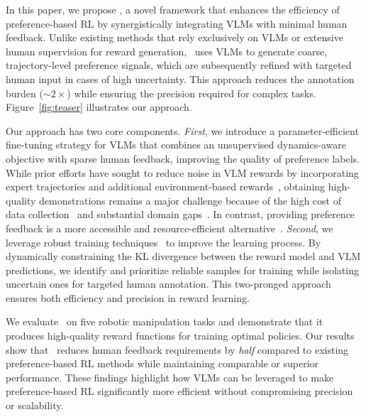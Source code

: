 In this paper, we propose \algo, a novel framework that enhances the efficiency of preference-based RL by synergistically integrating VLMs with minimal human feedback. Unlike existing methods that rely exclusively on VLMs or extensive human supervision for reward generation, \algo~uses VLMs to generate coarse, trajectory-level preference signals, which are subsequently refined with targeted human input in cases of high uncertainty. This approach reduces the annotation burden ($\sim 2\times$) while ensuring the precision required for complex tasks. 
Figure~\ref{fig:teaser} illustrates our approach.

Our approach has two core components. 
\textit{First}, we introduce a parameter-efficient fine-tuning strategy for VLMs that combines an unsupervised dynamics-aware objective with sparse human feedback, improving the quality of preference labels. 
While prior efforts have sought to reduce noise in VLM rewards by incorporating expert trajectories and additional environment-based rewards~\cite{fu2024furl}, obtaining high-quality demonstrations remains a major challenge because of the high cost of data collection~\cite{akgun2012keyframe} and substantial domain gaps~\cite{smith2019avid}. 
In contrast, providing preference feedback is a more accessible and resource-efficient alternative~\cite{hejna2023few}. 
\textit{Second}, we leverage robust training techniques~\cite{song2022learning,cheng2024rime} to improve the learning process. 
By dynamically constraining the KL divergence between the reward model and VLM predictions, we identify and prioritize reliable samples for training while isolating uncertain ones for targeted human annotation. 
This two-pronged approach ensures both efficiency and precision in reward learning.

We evaluate \algo~on five robotic manipulation tasks and demonstrate that it produces high-quality reward functions for training optimal policies. 
Our results show that \algo~reduces human feedback requirements by \emph{half} compared to existing preference-based RL methods while maintaining comparable or superior performance. 
These findings highlight how VLMs can be leveraged to make preference-based RL significantly more efficient without compromising precision or scalability.


